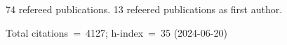 74 refereed publications. 13 refeered publications as first author.

Total citations~=~4127; h-index~=~35 (2024-06-20)